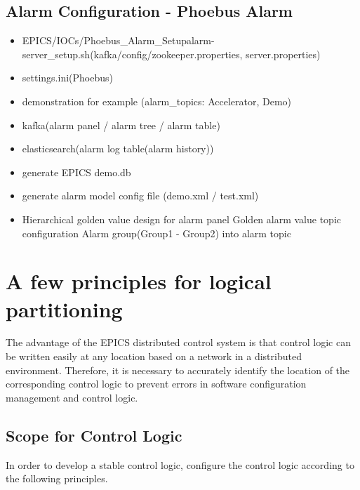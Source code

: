 \documentclass[11pt
  , letterpaper
  , article
  , oneside
  , showtrims
]{memoir}
\begin{document}
\section{Alarm Configuration - Phoebus Alarm}	
\begin{itemize}
	\item EPICS/IOCs/Phoebus\_Alarm\_Setup\/alarm-server\_setup.sh(kafka/config/zookeeper.properties,
server.properties)
	\item settings.ini(Phoebus)
	\item demonstration for example (alarm\_topics: Accelerator, Demo)
	\item kafka(alarm panel / alarm tree / alarm table)
	\item elasticsearch(alarm log table(alarm history))
	\item generate EPICS demo.db
	\item generate alarm model config file (demo.xml / test.xml)
	\item Hierarchical golden value design for alarm panel
	\subitem Golden alarm value topic configuration
	\subitem Alarm group(Group1 - Group2) into alarm topic
\end{itemize}

\chapter{A few principles for logical partitioning}
The advantage of the EPICS distributed control system is that control logic can be written easily at any location based on a network in a distributed environment. Therefore, it is necessary to accurately identify the location of the corresponding control logic to prevent errors in software configuration management and control logic. 

\section{Scope for Control Logic}
In order to develop a stable control logic, configure the control logic according to the following principles.
\end{document}
